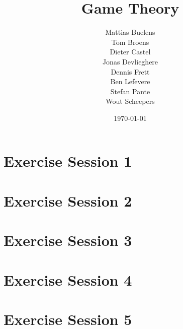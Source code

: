 \documentclass[a4paper, 11pt, oneside]{article}
\title{Game Theory}
\date{\today}
\author{Mattias Buelens \\ Tom Broens \\ Dieter Castel \\ Jonas Devlieghere \\ Dennis Frett \\ Ben Lefevere \\ Stefan Pante \\ Wout Scheepers }
\numberwithin{question}{section}
\theoremstyle{definition}
\numberwithin{solution}{section}
\begin{document}
\maketitle
\newpage

\tableofcontents
\newpage

\section{Exercise Session 1}


\section{Exercise Session 2}


\section{Exercise Session 3}


\section{Exercise Session 4}


\section{Exercise Session 5}


\nocite{*}
\printbibliography
\end{document}
